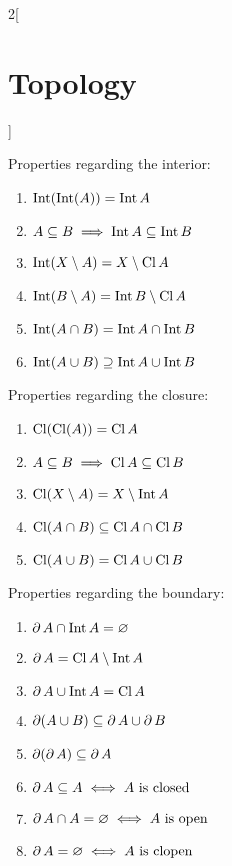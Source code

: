 \documentclass[../../../main.tex]{subfiles}
\begin{document}
\begin{multicols}{2}[\section{Topology}]
\begin{prop}
        Properties regarding the interior:
        \begin{enumerate}[leftmargin=1.15cm]\renewcommand{\labelenumi}{1.\arabic{enumi}.}
            \item $\operatorname{Int}(\operatorname{Int} (A))=         \operatorname{Int} A$
            \item $A\subseteq B\implies    \operatorname{Int} A\subseteq\operatorname{Int} B$
            \item $\operatorname{Int}(X\setminus A)=     X\setminus \operatorname{Cl} A$
            \item $\operatorname{Int}(B\setminus A)=     \operatorname{Int} B\setminus \operatorname{Cl} A$
            \item $\operatorname{Int}(A\cap B)=          \operatorname{Int} A\cap\operatorname{Int} B$
            \item $\operatorname{Int}(A\cup B)\supseteq  \operatorname{Int} A\cup\operatorname{Int} B$
        \end{enumerate}
        Properties regarding the closure:
        \begin{enumerate}[leftmargin=1.15cm]\renewcommand{\labelenumi}{2.\arabic{enumi}.}
            \item $\operatorname{Cl}(\operatorname{Cl} (A))=          \operatorname{Cl} A$
            \item $A\subseteq B\implies   \operatorname{Cl} A\subseteq\operatorname{Cl} B$
            \item $\operatorname{Cl}(X\setminus A)=     X\setminus \operatorname{Int} A$
            \item $\operatorname{Cl}(A\cap B)\subseteq  \operatorname{Cl} A\cap\operatorname{Cl} B$
            \item $\operatorname{Cl}(A\cup B)=          \operatorname{Cl} A\cup\operatorname{Cl} B$
        \end{enumerate}
        Properties regarding the boundary:
        \begin{enumerate}[leftmargin=1.15cm]\renewcommand{\labelenumi}{3.\arabic{enumi}.}
            \item $\operatorname{\partial} A\cap\operatorname{Int} A=         \varnothing$
            \item $\operatorname{\partial} A=\operatorname{Cl} A\setminus\operatorname{Int} A$
            \item $\operatorname{\partial} A\cup\operatorname{Int} A=             \operatorname{Cl} A$
            \item $\operatorname{\partial} (A\cup B)\subseteq \operatorname{\partial} A\cup \operatorname{\partial} B$
            \item $\operatorname{\partial} (\operatorname{\partial} A)\subseteq \operatorname{\partial} A$
            \item $\operatorname{\partial} A\subseteq A\iff  A  \text{ is closed}$
            \item $\operatorname{\partial} A\cap A=\varnothing\iff  A\text{ is open}$
            \item $\operatorname{\partial} A=\varnothing\iff\text{$A$ is clopen}$
        \end{enumerate}
    \end{prop}

\end{multicols}
\end{document}
